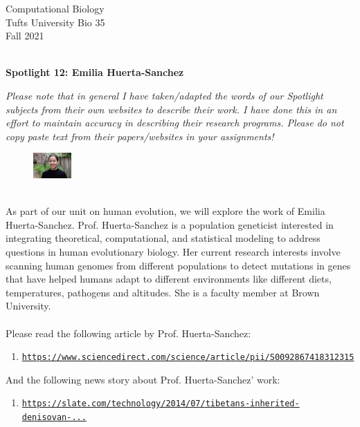 \documentclass{article}
\begin{document}
\begin{flushright}
Computational Biology ~\\
Tufts University Bio 35 ~\\
Fall 2021 ~\\ ~\\
\end{flushright}
\begin{center}{\textbf{\Large{Spotlight 12: Emilia Huerta-Sanchez}}}\end{center}

\textit{Please note that in general I have taken/adapted the words of our Spotlight subjects from their own websites to describe their work. I have done this in an effort to maintain accuracy in describing their research programs. Please do not copy paste text from their papers/websites in your assignments!}

\begin{figure}
\begin{center}
 \includegraphics[width=0.13\textwidth]{images/huerta-sanchez.jpeg}
 \end{center}
\end{figure}
~\\ As part of our unit on human evolution, we will explore the work of Emilia Huerta-Sanchez. Prof. Huerta-Sanchez is a population geneticist interested in integrating theoretical, computational, and statistical modeling to address questions in human evolutionary biology. Her current research interests involve scanning human genomes from different populations to detect mutations in genes that have helped humans adapt to different environments like different diets, temperatures, pathogens and altitudes. She is a faculty member at Brown University.
~\\ ~\\

Please read the following article by Prof. Huerta-Sanchez: 
\begin{enumerate}
\item \texttt{\href{https://www.sciencedirect.com/science/article/pii/S0092867418312315}{https://www.sciencedirect.com/science/article/pii/S0092867418312315}}
\end{enumerate}

And the following news story about Prof. Huerta-Sanchez' work:
\begin{enumerate}
\item \texttt{\href{https://slate.com/technology/2014/07/tibetans-inherited-denisovan-genetic-adaptation-for-elevation-dna-for-living-at-high-altitude.html}{https://slate.com/technology/2014/07/tibetans-inherited-denisovan-...}}
\end{enumerate}
\end{document}

